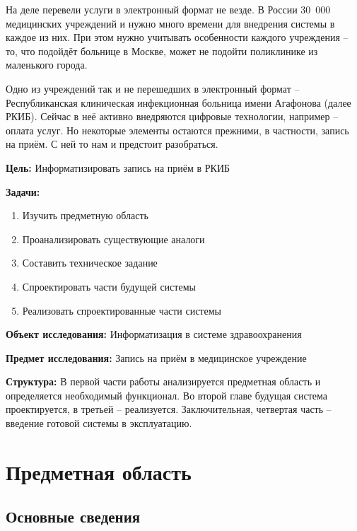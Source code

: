 \documentclass[a4paper,article]{article}
\begin{document}
        На деле перевели услуги в электронный формат не везде. В России 30~000 медицинских учреждений и нужно много времени для внедрения системы в каждое из них. При этом нужно учитывать особенности каждого учреждения -- то, что подойдёт больнице в Москве, может не подойти поликлинике из маленького города.

        Одно из учреждений так и не перешедших в электронный формат -- Республиканская клиническая инфекционная больница имени Агафонова (далее РКИБ). Сейчас в неё активно внедряются цифровые технологии, например -- оплата услуг. Но некоторые элементы остаются прежними, в частности, запись на приём. С ней то нам и предстоит разобраться.

        \textbf{Цель:} Информатизировать запись на приём в РКИБ

        \textbf{Задачи:}

        \begin{enumerate}[nolistsep]
            \item Изучить предметную область
            \item Проанализировать существующие аналоги
            \item Составить техническое задание
            \item Спроектировать части будущей системы
            \item Реализовать спроектированные части системы
        \end{enumerate}

        \textbf{Объект исследования:} Информатизация в системе здравоохранения

        \textbf{Предмет исследования:} Запись на приём в медицинское учреждение

        \textbf{Структура:} В первой части работы анализируется предметная область и определяется необходимый функционал. Во второй главе будущая система проектируется, в третьей -- реализуется. Заключительная, четвертая часть -- введение готовой системы в эксплуатацию.

        \newpage

    \section{Предметная область}

    \subsection{Основные сведения}
\end{document}
